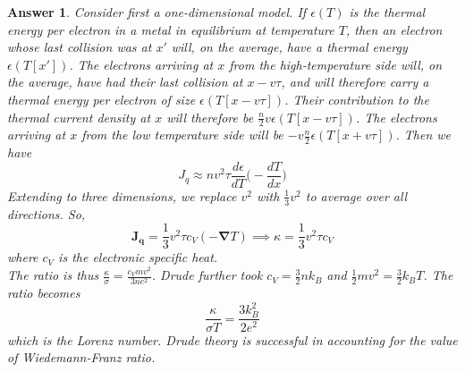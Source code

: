 \documentclass[a4paper]{article}
\newtheorem{ans}{Answer}[subsection]
\theoremstyle{new}
\begin{document}
\begin{ans}
Consider first a one-dimensional model. If $\epsilon(T)$ is the thermal energy per electron in a metal in equilibrium at temperature $T$, then an electron whose last collision was at $x'$ will, on the average, have a thermal energy $\epsilon(T[x'])$. The electrons arriving at $x$ from the high-temperature side will, on the average, have had their last collision at $x-v\tau$, and will therefore carry a thermal energy per electron of size $\epsilon(T[x-v\tau])$. Their contribution to the thermal current density at $x$ will therefore be $\frac{n}{2}v\epsilon(T[x-v\tau])$. The electrons arriving at $x$ from the low temperature side will be $-v\frac{n}{2}\epsilon(T[x+v\tau])$. Then we have 
$$J_q\approx nv^2\tau\frac{d\epsilon}{dT}\bigg(-\frac{dT}{dx}\bigg)$$
Extending to three dimensions, we replace $v^2$ with $\frac{1}{3}v^2$ to average over all directions. So,
$$\mathbf{J_q}=\frac{1}{3}v^2\tau c_V(-\boldsymbol{\nabla}T)\implies\kappa=\frac{1}{3}v^2\tau c_V$$
where $c_V$ is the electronic specific heat.\\[5pt]
The ratio is thus $\frac{\kappa}{\sigma}=\frac{c_Vmv^2}{3ne^2}$. Drude further took $c_V=\frac{3}{2}nk_B$ and $\frac{1}{2}mv^2=\frac{3}{2}k_BT$. The ratio becomes
$$\frac{\kappa}{\sigma T}=\frac{3k_B^2}{2e^2}$$
which is the Lorenz number. Drude theory is successful in accounting for the value of Wiedemann-Franz ratio. 
\end{ans}
\end{document}
